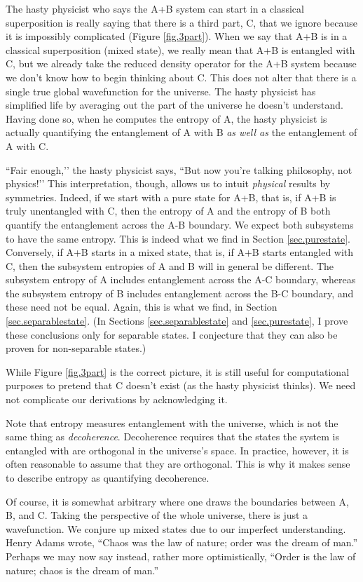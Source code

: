 The hasty physicist who says the A+B system can start in a classical superposition is really saying that there is a third part, C, that we ignore because it is impossibly complicated (Figure \ref{fig.3part}). When we say that A+B is in a classical superposition (mixed state), we really mean that A+B is entangled with C, but we already take the reduced density operator for the A+B system because we don’t know how to begin thinking about C. This does not alter that there is a single true global wavefunction for the universe. The hasty physicist has simplified life by averaging out the part of the universe he doesn’t understand. Having done so, when he computes the entropy of A, the hasty physicist is actually quantifying the entanglement of A with B \emph{as well as} the entanglement of A with C.

``Fair enough,’’ the hasty physicist says, ``But now you’re talking philosophy, not physics!’’ This interpretation, though, allows us to intuit \emph{physical} results by symmetries. Indeed, if we start with a pure state for A+B, that is, if A+B is truly unentangled with C, then the entropy of A and the entropy of B both quantify the entanglement across the A-B boundary. We expect both subsystems to have the same entropy. This is indeed what we find in Section \ref{sec.purestate}. Conversely, if A+B starts in a mixed state, that is, if A+B starts entangled with C, then the subsystem entropies of A and B will in general be different. The subsystem entropy of A includes entanglement across the A-C boundary, whereas the subsystem entropy of B includes entanglement across the B-C boundary, and these need not be equal. Again, this is what we find, in Section \ref{sec.separablestate}. (In Sections \ref{sec.separablestate} and \ref{sec.purestate}, I prove these conclusions only for separable states. I conjecture that they can also be proven for non-separable states.)

While Figure \ref{fig.3part} is the correct picture, it is still useful for computational purposes to pretend that C doesn’t exist (as the hasty physicist thinks). We need not complicate our derivations by acknowledging it.

Note that entropy measures entanglement with the universe, which is not the same thing as \emph{decoherence}. Decoherence requires that the states the system is entangled with are orthogonal in the universe’s space. In practice, however, it is often reasonable to assume that they are orthogonal. This is why it makes sense to describe entropy as quantifying decoherence.

Of course, it is somewhat arbitrary where one draws the boundaries between A, B, and C. Taking the perspective of the whole universe, there is just a wavefunction. We conjure up mixed states due to our imperfect understanding. 
Henry Adams wrote, “Chaos was the law of nature; order was the dream of man.” Perhaps we may now say instead, rather more optimistically, “Order is the law of nature; chaos is the dream of man.”

